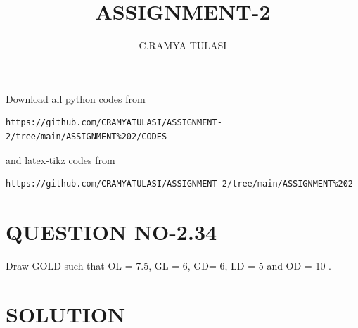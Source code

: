 \documentclass[journal,12pt,twocolumn]{IEEEtran}
\begin{document}
     \def\rightbox#1{\makebox[0in][r]{#1}}
     \def\centbox#1{\makebox[0in]{#1}}
     \def\topbox#1{\raisebox{-\baselineskip}[0in][0in]{#1}}
     \def\midbox#1{\raisebox{-0.5\baselineskip}[0in][0in]{#1}}
\vspace{3cm}
\title{ASSIGNMENT-2}
\author{C.RAMYA TULASI}
\maketitle
\newpage
\bigskip
\renewcommand{\thefigure}{\theenumi}
\renewcommand{\thetable}{\theenumi}
Download all python codes from 
\begin{lstlisting}
https://github.com/CRAMYATULASI/ASSIGNMENT-2/tree/main/ASSIGNMENT%202/CODES
\end{lstlisting}
%
and latex-tikz codes from 
%
\begin{lstlisting}
https://github.com/CRAMYATULASI/ASSIGNMENT-2/tree/main/ASSIGNMENT%202
\end{lstlisting}
%
\section{QUESTION NO-2.34}
\item  Draw GOLD such that OL = 7.5, GL = 6, GD= 6, LD = 5 and OD = 10 .
%
%
\section{SOLUTION}
 
\end{document}
